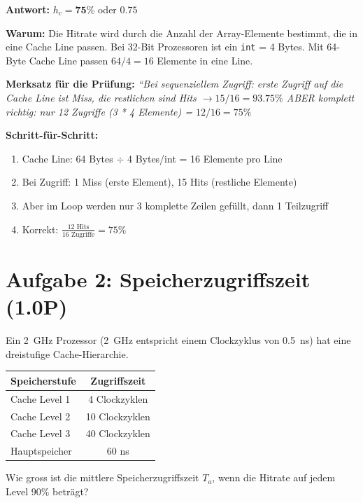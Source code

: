 \documentclass[a4paper,11pt]{article}
\begin{document}
\begin{tcolorbox}[colback=green!15!white,colframe=green!70!black,title=\textbf{Lösung Aufgabe 1}]
\textbf{Antwort:} $h_c = \mathbf{75\%}$ oder $\mathbf{0.75}$

\textbf{Warum:} Die Hitrate wird durch die Anzahl der Array-Elemente bestimmt, die in eine Cache Line passen. Bei 32-Bit Prozessoren ist ein \texttt{int} = 4 Bytes. Mit 64-Byte Cache Line passen $64 / 4 = 16$ Elemente in eine Line.

\textbf{Merksatz für die Prüfung:} \textit{``Bei sequenziellem Zugriff: erste Zugriff auf die Cache Line ist Miss, die restlichen sind Hits $\rightarrow 15/16 = 93.75\%$ ABER komplett richtig: nur 12 Zugriffe (3 * 4 Elemente) = $12/16 = 75\%$}

\textbf{Schritt-für-Schritt:}
\begin{enumerate}[leftmargin=*]
  \item Cache Line: 64 Bytes $\div$ 4 Bytes/int = 16 Elemente pro Line
  \item Bei Zugriff: 1 Miss (erste Element), 15 Hits (restliche Elemente)
  \item Aber im Loop werden nur 3 komplette Zeilen gefüllt, dann 1 Teilzugriff
  \item Korrekt: $\frac{12 \text{ Hits}}{16 \text{ Zugriffe}} = 75\%$
\end{enumerate}
\end{tcolorbox}

\section{Aufgabe 2: Speicherzugriffszeit (1.0P)}
Ein 2~GHz Prozessor (2~GHz entspricht einem Clockzyklus von 0.5~ns) hat eine dreistufige Cache-Hierarchie.

\begin{center}
\begin{tabular}{|l|c|}
\hline
\textbf{Speicherstufe} & \textbf{Zugriffszeit} \\
\hline
Cache Level 1 & 4 Clockzyklen \\
Cache Level 2 & 10 Clockzyklen \\
Cache Level 3 & 40 Clockzyklen \\
Hauptspeicher & 60 ns \\
\hline
\end{tabular}
\end{center}

Wie gross ist die mittlere Speicherzugriffszeit $T_a$, wenn die Hitrate auf jedem Level 90\% beträgt?
\end{document}
